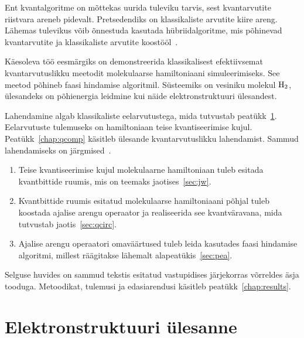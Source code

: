 \documentclass[12pt]{report}
\begin{document}
Ent kvantalgoritme on mõttekas uurida tuleviku tarvis, sest kvantarvutite riistvara areneb pidevalt.
Pretsedendiks on klassikaliste arvutite kiire areng.
Lähemas tulevikus võib õnnestuda kasutada hübriidalgoritme, mis põhinevad kvantarvutite ja klassikaliste arvutite koostööl~\cite{omalley+etal}.

Käesoleva töö eesmärgiks on demonstreerida klassikalisest efektiivsemat kvantarvutuslikku meetodit molekulaarse hamiltoniaani simuleerimiseks.
See meetod põhineb faasi hindamise algoritmil.
Süsteemiks on vesiniku molekul \(\rm H_2\), ülesandeks on põhienergia leidmine kui näide elektronstruktuuri ülesandest.

Lahendamine algab klassikaliste eelarvutustega, mida tutvustab peatükk~\ref{chap:qchem}.
Eelarvutuste tulemuseks on hamiltoniaan teise kvantiseerimise kujul.
Peatükk~\ref{chap:qcomp} käsitleb ülesande kvantarvutuslikku lahendamist.
Sammud lahendamiseks on järgmised~\cite{whitfield+etal2011}.

\begin{enumerate}
    \item Teise kvantiseerimise kujul molekulaarne hamiltoniaan tuleb esitada kvantbittide ruumis, mis on teemaks jaotises~\ref{sec:jw}.
    \item Kvantbittide ruumis esitatud molekulaarse hamiltoniaani põhjal tuleb koostada ajalise arengu operaator ja realiseerida see kvantväravana, mida tutvustab jaotis~\ref{sec:qcirc}.
    \item Ajalise arengu operaatori omaväärtused tuleb leida kasutades faasi hindamise algoritmi, millest räägitakse lähemalt alapeatükis~\ref{sec:pea}.
\end{enumerate}
Selguse huvides on sammud tekstis esitatud vastupidises järjekorras võrreldes äsja tooduga.
Metoodikat, tulemusi ja edasiarendusi käsitleb peatükk~\ref{chap:results}.

\chapter{Elektronstruktuuri ülesanne}\label{chap:qchem}
\end{document}
